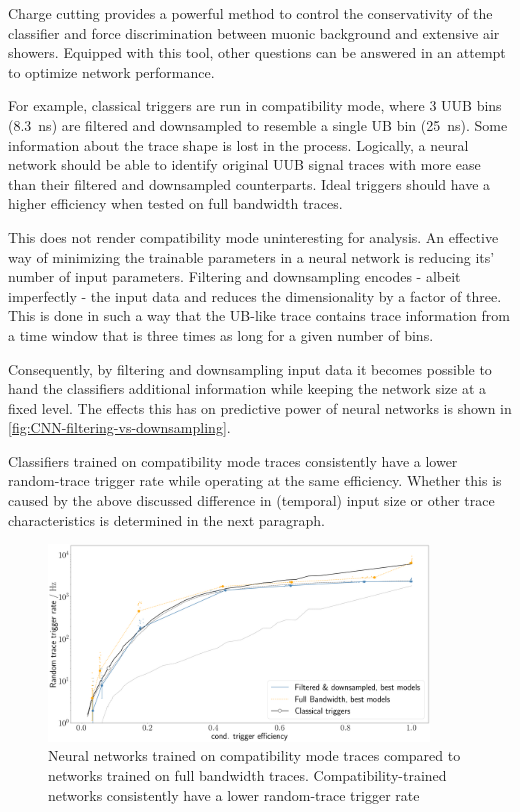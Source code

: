 Charge cutting provides a powerful method to control the conservativity of the classifier and force discrimination between muonic background and extensive air 
showers. Equipped with this tool, other questions can be answered in an attempt to optimize network performance.

For example, classical triggers are run in compatibility mode, where 3 UUB bins (\SI{8.3}{\nano\second}) are filtered and downsampled to resemble a single UB bin 
(\SI{25}{\nano\second}). Some information about the trace shape is lost in the process. Logically, a neural network should be able to identify original UUB signal 
traces with more ease than their filtered and downsampled counterparts. Ideal triggers should have a higher efficiency when tested on full bandwidth traces.

This does not render compatibility mode uninteresting for analysis. An effective way of minimizing the trainable parameters in a neural network is reducing its' 
number of input parameters. Filtering and downsampling encodes - albeit imperfectly - the input data and reduces the dimensionality by a factor of three. This is
done in such a way that the UB-like trace contains trace information from a time window that is three times as long for a given number of bins.

Consequently, by filtering and downsampling input data it becomes possible to hand the classifiers additional information while keeping the network size at a fixed
level. The effects this has on predictive power of neural networks is shown in \autoref{fig:CNN-filtering-vs-downsampling}.

Classifiers trained on compatibility mode traces consistently have a lower random-trace trigger rate while operating at the same efficiency. Whether this is caused
by the above discussed difference in (temporal) input size or other trace characteristics is determined in the next paragraph.

\begin{figure}
	\centering
	\includegraphics[width=0.9\textwidth]{./plots/full_bandwidth_vs_filtering.png}
	\caption{Neural networks trained on compatibility mode traces compared to networks trained on full bandwidth traces. Compatibility-trained networks 
	consistently have a lower random-trace trigger rate}
	\label{fig:CNN-filtering-vs-downsampling}
\end{figure}

